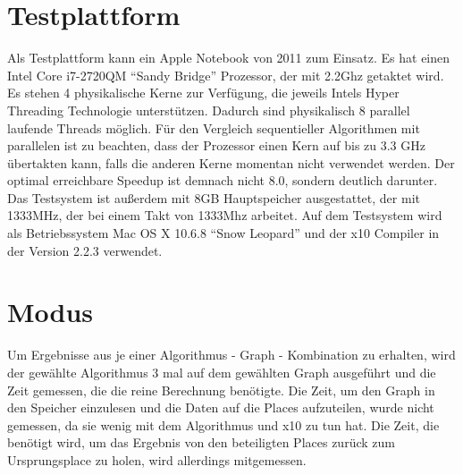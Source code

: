 \section{Testplattform} %
\label{sec:testplattform}
Als Testplattform kann ein Apple Notebook von 2011 zum Einsatz. Es hat einen Intel Core i7-2720QM \enquote{Sandy Bridge} Prozessor, der mit 2.2Ghz getaktet wird. Es stehen 4 physikalische Kerne zur Verfügung, die jeweils Intels Hyper Threading Technologie unterstützen. Dadurch sind physikalisch 8 parallel laufende Threads möglich. Für den Vergleich sequentieller Algorithmen mit parallelen ist zu beachten, dass der Prozessor einen Kern auf bis zu 3.3 GHz übertakten kann, falls die anderen Kerne momentan nicht verwendet werden. Der optimal erreichbare Speedup ist demnach nicht 8.0, sondern deutlich darunter. Das Testsystem ist außerdem mit 8GB Hauptspeicher ausgestattet, der mit 1333MHz, der bei einem Takt von 1333Mhz arbeitet. Auf dem Testsystem wird als Betriebssystem Mac OS X 10.6.8 \enquote{Snow Leopard} und der x10 Compiler in der Version 2.2.3 verwendet.

\section{Modus} %
\label{sec:modus}
Um Ergebnisse aus je einer Algorithmus - Graph - Kombination zu erhalten, wird der gewählte Algorithmus 3 mal auf dem gewählten Graph ausgeführt und die Zeit gemessen, die die reine Berechnung benötigte. Die Zeit, um den Graph in den Speicher einzulesen und die Daten auf die Places aufzuteilen, wurde nicht gemessen, da sie wenig mit dem Algorithmus und x10 zu tun hat. Die Zeit, die benötigt wird, um das Ergebnis von den beteiligten Places zurück zum Ursprungsplace zu holen, wird allerdings mitgemessen.

